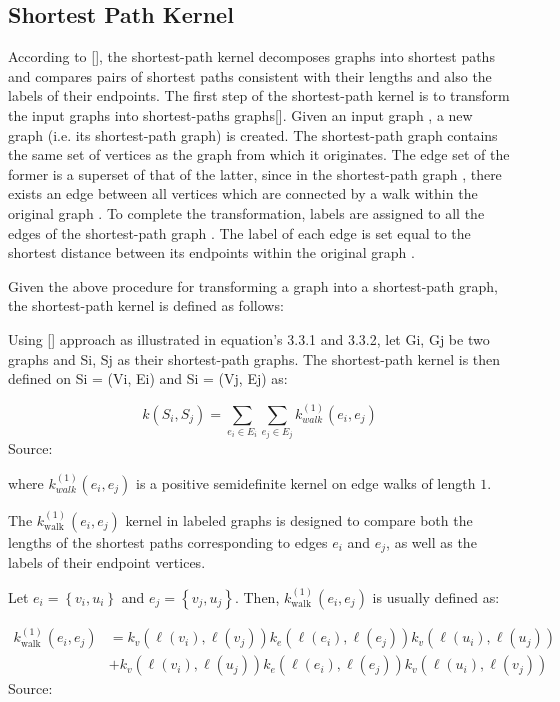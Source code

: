 \subsection{Shortest Path Kernel}

According to [\cite{Karsten:2005}], the shortest-path kernel decomposes graphs into shortest paths and compares pairs of shortest paths consistent with their lengths and also the labels of their endpoints. The first step of the shortest-path kernel is to transform the input graphs into shortest-paths graphs[\cite{Siglidis:2018}]. Given an input graph , a new graph  (i.e. its shortest-path graph) is created. The shortest-path graph  contains the same set of vertices as the graph from which it originates. The edge set of the former is a superset of that of the latter, since in the shortest-path graph , there exists an edge between all vertices which are connected by a walk within the original graph . To complete the transformation, labels are assigned to all the edges of the shortest-path graph . The label of each edge is set equal to the shortest distance between its endpoints within the original graph .

Given the above procedure for transforming a graph into a shortest-path graph, the shortest-path kernel is defined as follows:

Using [\cite{Karsten:2005}]  approach as illustrated in equation's 3.3.1 and 3.3.2, let Gi, Gj be two graphs and Si, Sj as their shortest-path graphs. The shortest-path kernel is then defined on Si  = (Vi, Ei) and Si = (Vj, Ej) as:

\begin{equation}
k\left(S_{i}, S_{j}\right)=\sum_{e_{i} \in E_{i}} \sum_{e_{j} \in E_{j}} k_{w a l k}^{(1)}\left(e_{i}, e_{j}\right)
\end{equation}
Source: \cite{Siglidis:2018}

where $k_{w a l k}^{(1)}\left(e_{i}, e_{j}\right)$ is a positive semidefinite kernel on edge walks of length $1 .$

The $k_{\text {walk }}^{(1)}\left(e_{i}, e_{j}\right)$ kernel in labeled graphs is designed to compare both the lengths of the shortest paths corresponding to edges $e_{i}$ and $e_{j}$, as well as the labels of their endpoint vertices.

Let $e_{i}=\left\{v_{i}, u_{i}\right\}$ and $e_{j}=\left\{v_{j}, u_{j}\right\}$. Then, $k_{\text {walk }}^{(1)}\left(e_{i}, e_{j}\right)$ is usually defined as:

\begin{equation}
\begin{aligned}
k_{\text {walk }}^{(1)}\left(e_{i}, e_{j}\right) &=k_{v}\left(\ell\left(v_{i}\right), \ell\left(v_{j}\right)\right) k_{e}\left(\ell\left(e_{i}\right), \ell\left(e_{j}\right)\right) k_{v}\left(\ell\left(u_{i}\right), \ell\left(u_{j}\right)\right) \\
&+k_{v}\left(\ell\left(v_{i}\right), \ell\left(u_{j}\right)\right) k_{e}\left(\ell\left(e_{i}\right), \ell\left(e_{j}\right)\right) k_{v}\left(\ell\left(u_{i}\right), \ell\left(v_{j}\right)\right)
\end{aligned}
\end{equation}
Source: \cite{Siglidis:2018}

